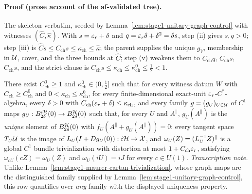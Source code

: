 \paragraph{Proof (prose account of the af-validated tree).}
The skeleton verbatim, seeded by Lemma~\ref{lem:stage1-unitary-graph-control} with
witnesses $(\hat C,\hat\kappa)$. With $s=\varepsilon_r+\delta$ and $q=\varepsilon_r\delta+\delta^{2}=\delta s$,
step (ii) gives $s,q>0$; step (iii) is
$\hat Cs\le C_{\mathrm{ch}}s\le\kappa_{\mathrm{ch}}\le\hat\kappa$; the parent supplies the
unique $g_V$, membership in $\mathcal U$, cover, and the three bounds at $\hat C$; step (v)
weakens them to $C_{\mathrm{ch}}q$, $C_{\mathrm{ch}}s$, $C_{\mathrm{ch}}s$, and the strict
clause is
$C_{\mathrm{ch}}s\le\kappa_{\mathrm{ch}}\le\kappa^{0}_{\mathrm{ch}}\le\tfrac12<1$.

\begin{lemma}\label{lem:stage1-maurer-cartan-transport}
There exist $C^{0}_{\mathrm{ch}}\ge1$ and $\kappa^{0}_{\mathrm{ch}}\in(0,\tfrac12]$ such
that for every witness datum $W$ with $C_{\mathrm{ch}}\ge C^{0}_{\mathrm{ch}}$ and
$0<\kappa_{\mathrm{ch}}\le\kappa^{0}_{\mathrm{ch}}$, for every finite-dimensional
exact-unit $\varepsilon_r$-$C^*$-algebra, every $\delta>0$ with
$C_{\mathrm{ch}}(\varepsilon_r+\delta)\le\kappa_{\mathrm{ch}}$, and every family
$g=(g_U)_{U\in\mathcal U}$ of $C^{1}$ maps $g_U:B^{i\mathcal H}_{2\delta}(0)\to B^{\mathcal H}_{2\delta}(0)$
such that, for every $U$ and $A^{\parallel}$, $g_U(A^{\parallel})$ is the \emph{unique}
element of $B^{\mathcal H}_{2\delta}(0)$ with $f_U(A^{\parallel}+g_U(A^{\parallel}))=0$: every
tangent space $T_U\mathcal U$ is the image of $L_{U}(I+Dg_U(0)):i\mathcal H\to\mathcal X$, and
$\omega_U(Z)=(L_{U}^{-1}Z)^{\parallel}$ is a global $C^{1}$ bundle trivialization with
distortion at most $1+C_{\mathrm{ch}}\varepsilon_r$, satisfying $\omega_{cU}(cZ)=\omega_U(Z)$ and
$\omega_U(iU)=iJ$ for every $c\in U(1)$.
\emph{Transcription note.} Unlike Lemma~\ref{lem:stage1-maurer-cartan-trivialization},
whose graph maps are the distinguished family supplied by
Lemma~\ref{lem:stage1-unitary-graph-control}, this row quantifies over \emph{any} family
with the displayed uniqueness property.
\end{lemma}

